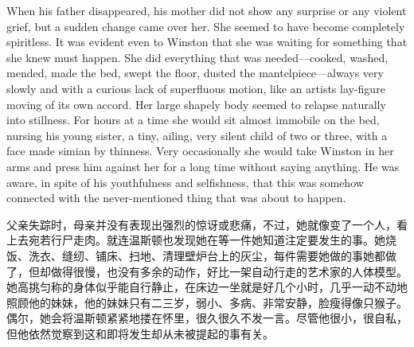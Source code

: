 \begin{paracol}{2}
\switchcolumn*

When his father disappeared, his mother did not show any surprise or any
violent grief, but a sudden change came over her. She seemed to have
become completely spiritless. It was evident even to Winston that she
was waiting for something that she knew must happen. She did everything
that was needed---cooked, washed, mended, made the bed, swept the floor,
dusted the mantelpiece---always very slowly and with a curious lack of
superfluous motion, like an artist\textquotesingle s lay-figure moving
of its own accord. Her large shapely body seemed to relapse naturally
into stillness. For hours at a time she would sit almost immobile on the
bed, nursing his young sister, a tiny, ailing, very silent child of two
or three, with a face made simian by thinness. Very occasionally she
would take Winston in her arms and press him against her for a long time
without saying anything. He was aware, in spite of his youthfulness and
selfishness, that this was somehow connected with the never-mentioned
thing that was about to happen.

\switchcolumn

父亲失踪时，母亲并没有表现出强烈的惊讶或悲痛，不过，她就像变了一个人，看上去宛若行尸走肉。就连温斯顿也发现她在等一件她知道注定要发生的事。她烧饭、洗衣、缝纫、铺床、扫地、清理壁炉台上的灰尘，每件需要她做的事她都做了，但却做得很慢，也没有多余的动作，好比一架自动行走的艺术家的人体模型。她高挑匀称的身体似乎能自行静止，在床边一坐就是好几个小时，几乎一动不动地照顾他的妹妹，他的妹妹只有二三岁，弱小、多病、非常安静，脸瘦得像只猴子。偶尔，她会将温斯顿紧紧地搂在怀里，很久很久不发一言。尽管他很小，很自私，但他依然觉察到这和即将发生却从未被提起的事有关。

\switchcolumn*


\end{paracol}
